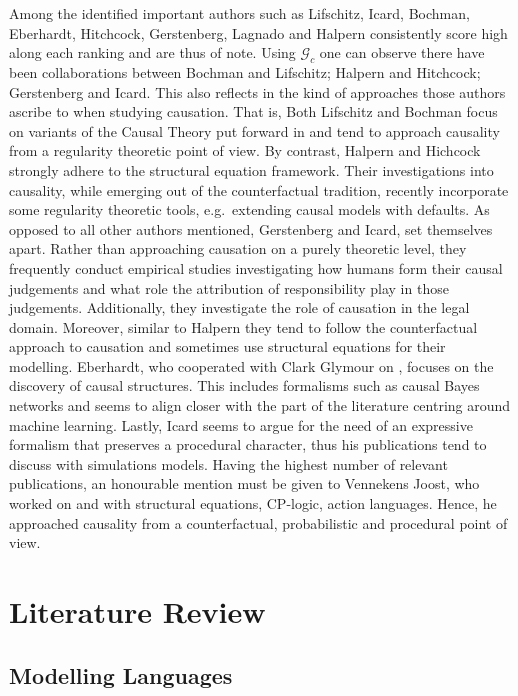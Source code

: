 \documentclass[11pt,a4paper]{book}
\theoremstyle{definition}
\theoremstyle{definition}
\theoremstyle{definition}
\theoremstyle{remark}
\newcommand{\cgraph}{\mathcal{G}_{c}}
\begin{document}
Among the identified important authors such as Lifschitz, Icard, Bochman, Eberhardt, Hitchcock, Gerstenberg, Lagnado and Halpern consistently score high along each ranking and are thus of note.
Using $\cgraph$ one can observe there have been collaborations between Bochman and Lifschitz; Halpern and Hitchcock; Gerstenberg and Icard. 
This also reflects in the kind of approaches those authors ascribe to when studying causation. That is, 
Both Lifschitz and Bochman focus on variants of the Causal Theory put forward in \cite{mccain1997causal} and tend to approach causality from a regularity theoretic point of view. By contrast, Halpern and Hichcock strongly adhere to the structural equation framework. Their investigations into causality, while emerging out of the counterfactual tradition, recently incorporate some regularity theoretic tools, e.g.\ extending causal models with defaults.
As opposed to all other authors mentioned, Gerstenberg and Icard, set themselves apart. Rather than approaching causation on a purely theoretic level, they frequently conduct empirical studies investigating how humans form their causal judgements and what role the attribution of responsibility play in those judgements. Additionally, they investigate the role of causation in the legal domain. Moreover, similar to Halpern they tend to follow the counterfactual approach to causation and sometimes use structural equations for their modelling.
Eberhardt, who cooperated with Clark Glymour on \parencite{glymour2010actual}, focuses on the discovery of causal structures. This includes formalisms such as causal Bayes networks and seems to align closer with the part of the literature centring around machine learning. Lastly, Icard seems to argue for the need of an expressive formalism that preserves a procedural character, thus his publications tend to discuss with simulations models.
Having the highest number of relevant publications, an honourable mention must be given to Vennekens Joost, who worked on and with structural equations, CP-logic, action languages. Hence, he approached causality from a counterfactual, probabilistic and procedural point of view.



\chapter{Literature Review}
\label{ch:literature_review}


\section{Modelling Languages}
\end{document}
